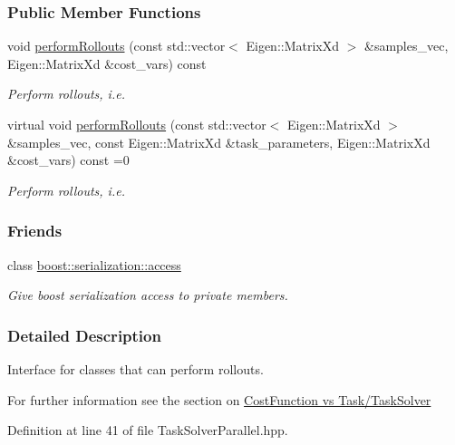\subsubsection*{Public Member Functions}
\begin{DoxyCompactItemize}
\item 
void \hyperlink{classDmpBbo_1_1TaskSolverParallel_ab6bf8d682d404ed901d8947b7ff86f3e}{perform\+Rollouts} (const std\+::vector$<$ Eigen\+::\+Matrix\+Xd $>$ \&samples\+\_\+vec, Eigen\+::\+Matrix\+Xd \&cost\+\_\+vars) const 
\begin{DoxyCompactList}\small\item\em Perform rollouts, i.\+e. \end{DoxyCompactList}\item 
virtual void \hyperlink{classDmpBbo_1_1TaskSolverParallel_aa91bb4c2ddec55ee7c594cd639094d36}{perform\+Rollouts} (const std\+::vector$<$ Eigen\+::\+Matrix\+Xd $>$ \&samples\+\_\+vec, const Eigen\+::\+Matrix\+Xd \&task\+\_\+parameters, Eigen\+::\+Matrix\+Xd \&cost\+\_\+vars) const =0
\begin{DoxyCompactList}\small\item\em Perform rollouts, i.\+e. \end{DoxyCompactList}\end{DoxyCompactItemize}
\subsubsection*{Friends}
\begin{DoxyCompactItemize}
\item 
class \hyperlink{classDmpBbo_1_1TaskSolverParallel_ac98d07dd8f7b70e16ccb9a01abf56b9c}{boost\+::serialization\+::access}
\begin{DoxyCompactList}\small\item\em Give boost serialization access to private members. \end{DoxyCompactList}\end{DoxyCompactItemize}


\subsubsection{Detailed Description}
Interface for classes that can perform rollouts. 

For further information see the section on \hyperlink{page_bbo_sec_bbo_task_and_task_solver}{Cost\+Function vs Task/\+Task\+Solver} 

Definition at line 41 of file Task\+Solver\+Parallel.\+hpp.



